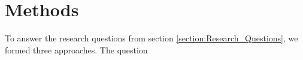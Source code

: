 \chapter{Methods}\label{chapter:Methods}

To answer the research questions from section \ref{section:Research_Questions}, we formed three approaches.
The question 


\newpage

\newpage
